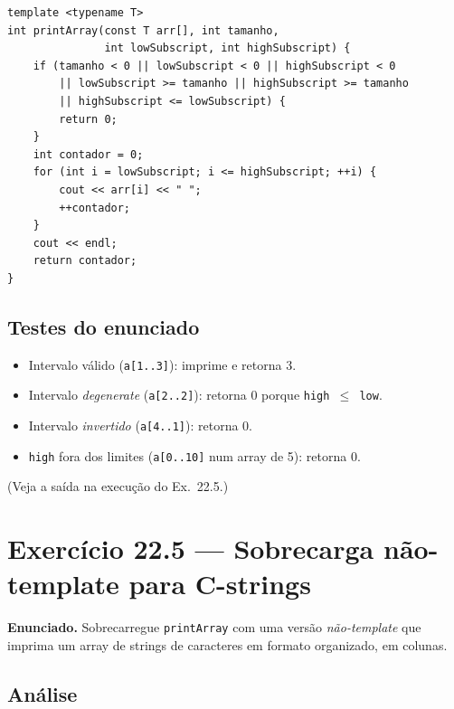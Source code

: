 \documentclass[11pt,a4paper]{article}
\begin{document}
\begin{lstlisting}[style=cppcode,numbers=none]
template <typename T>
int printArray(const T arr[], int tamanho,
               int lowSubscript, int highSubscript) {
    if (tamanho < 0 || lowSubscript < 0 || highSubscript < 0
        || lowSubscript >= tamanho || highSubscript >= tamanho
        || highSubscript <= lowSubscript) {
        return 0;
    }
    int contador = 0;
    for (int i = lowSubscript; i <= highSubscript; ++i) {
        cout << arr[i] << " ";
        ++contador;
    }
    cout << endl;
    return contador;
}
\end{lstlisting}

\subsection*{Testes do enunciado}

\begin{itemize}[leftmargin=*,itemsep=0pt]
  \item Intervalo v\'alido (\texttt{a[1..3]}): imprime e retorna 3.
  \item Intervalo \emph{degenerate} (\texttt{a[2..2]}): retorna 0 porque \texttt{high $\leq$ low}.
  \item Intervalo \emph{invertido} (\texttt{a[4..1]}): retorna 0.
  \item \texttt{high} fora dos limites (\texttt{a[0..10]} num array de 5): retorna 0.
\end{itemize}

(Veja a sa\'ida na execu\c{c}\~ao do Ex.~22.5.)

\section{Exerc\'icio 22.5 --- Sobrecarga n\~ao-template para C-strings}

\begin{enunciado}
\textbf{Enunciado.} Sobrecarregue \texttt{printArray} com uma vers\~ao \emph{n\~ao-template} que imprima um array de strings de caracteres em formato organizado, em colunas.
\end{enunciado}

\subsection*{An\'alise}
\end{document}
